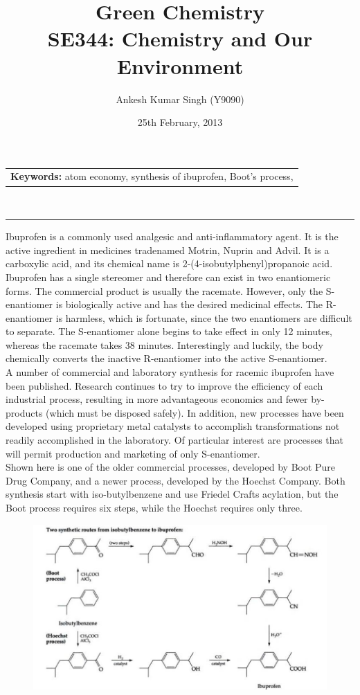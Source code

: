 \documentclass[pdftex,11pt,a4paper]{article}
\title{\vspace{-15pt}Green Chemistry\\ SE344: Chemistry and Our Environment}
\author{Ankesh Kumar Singh (Y9090)}
\date{25th February, 2013}
\begin{document}
\maketitle
\begin{tabular}{p{370pt}}
\textbf{Keywords: }atom economy, synthesis of ibuprofen, Boot's process, 
\end{tabular}
\vspace{10pt}\\
\hrule
\vspace{10pt}
Ibuprofen is a commonly used analgesic and anti-inflammatory agent. It is the active ingredient in medicines tradenamed Motrin, Nuprin and Advil. It is a carboxylic acid, and its chemical name is 2-(4-isobutylphenyl)propanoic acid. Ibuprofen has a single stereomer and therefore can exist in two enantiomeric forms. The commercial product is usually the racemate. However, only the S-enantiomer is biologically active and has the desired medicinal effects. The R-enantiomer is harmless, which is fortunate, since the two enantiomers are difficult to separate. The S-enantiomer alone begins to take effect in only 12 minutes, whereas the racemate takes 38 minutes. Interestingly and luckily, the body chemically converts the inactive R-enantiomer into the active S-enantiomer.\\

A number of commercial and laboratory synthesis for racemic ibuprofen have been published. Research continues to try to improve the efficiency of each industrial process, resulting in more advantageous economics and fewer by-products (which must be disposed safely). In addition, new processes have been developed using proprietary metal catalysts to accomplish transformations not readily accomplished in the laboratory. Of particular interest are processes that will permit production and marketing of only S-enantiomer.\\

Shown here is one of the older commercial processes, developed by Boot Pure Drug Company, and a newer process, developed by the Hoechst Company. Both synthesis start with iso-butylbenzene and use Friedel Crafts acylation, but the Boot process requires six steps, while the Hoechst requires only three.\\
\begin{figure}[htb]
\centering
\includegraphics[clip=true,trim=0pt 0pt 0pt 0pt,scale=0.63]{ibuprofrn.png}
\end{figure} 
\end{document}
